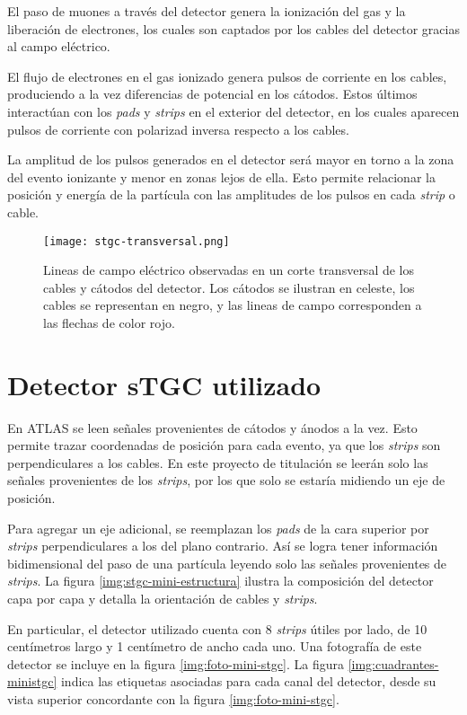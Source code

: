 	El paso de muones a través del detector genera la ionización del gas y la liberación de electrones, los cuales son captados por los cables del detector gracias al campo eléctrico.
	
	El flujo de electrones en el gas ionizado genera pulsos de corriente en los cables, produciendo a la vez diferencias de potencial en los cátodos. Estos últimos interactúan con los \textit{pads} y \textit{strips} en el exterior del detector, en los cuales aparecen pulsos de corriente con polarizad inversa respecto a los cables.
	
	La amplitud de los pulsos generados en el detector será mayor en torno a la zona del evento ionizante y menor en zonas lejos de ella. Esto permite relacionar la posición y energía de la partícula con las amplitudes de los pulsos en cada \textit{strip} o cable.
	
	\begin{figure}[h]
		\centering
		\texttt{[image: stgc-transversal.png]}
		\caption{Lineas de campo eléctrico observadas en un corte transversal de los cables y cátodos del detector. Los cátodos se ilustran en celeste, los cables se representan en negro, y las lineas de campo corresponden a las flechas de color rojo\cite{GEMTracker}.}
		\label{img:stgc-field}
	\end{figure}

\newpage
\section{Detector sTGC utilizado}
	En ATLAS se leen señales provenientes de cátodos y ánodos a la vez. Esto permite trazar coordenadas de posición para cada evento, ya que los \textit{strips} son perpendiculares a los cables. En este proyecto de titulación se leerán solo las señales provenientes de los \textit{strips}, por los que solo se estaría midiendo un eje de posición. 
	
	Para agregar un eje adicional, se reemplazan los \textit{pads} de la cara superior por \textit{strips} perpendiculares a los del plano contrario. Así se logra tener información bidimensional del paso de una partícula leyendo solo las señales provenientes de \textit{strips}. La figura \ref{img:stgc-mini-estructura} ilustra la composición del detector capa por capa y detalla la orientación de cables y \textit{strips}.
	
	En particular, el detector utilizado cuenta con 8 \textit{strips} útiles por lado, de 10 centímetros largo y 1 centímetro de ancho cada uno. Una fotografía de este detector se incluye en la figura \ref{img:foto-mini-stgc}. La figura \ref{img:cuadrantes-ministgc} indica las etiquetas asociadas para cada canal del detector, desde su vista superior concordante con la figura \ref{img:foto-mini-stgc}.
	
